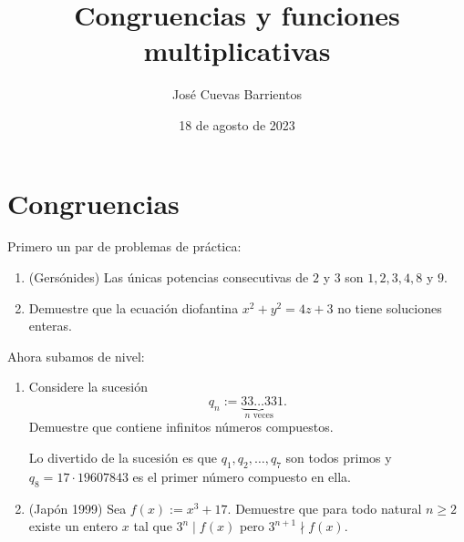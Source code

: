 \documentclass[11pt, reqno]{amsart}
\title{Congruencias y funciones multiplicativas}
\date{18 de agosto de 2023}
\author[José Cuevas]{José Cuevas Barrientos}
\begin{document}
\maketitle

\section{Congruencias}

\noindent
Primero un par de problemas de práctica:
\begin{enumerate}
	\item (Gersónides) Las únicas potencias consecutivas de $2$ y $3$ son $1, 2, 3, 4, 8$ y $9$.

	\item Demuestre que la ecuación diofantina $x^2 + y^2 = 4z + 3$ no tiene soluciones enteras.

\end{enumerate}
Ahora subamos de nivel:
\begin{enumerate}[resume]
	\item Considere la sucesión
		\[
			q_n := \underbrace{33\dots 33}_{n\text{ veces}} 1.
		\]
		Demuestre que contiene infinitos números compuestos.

		Lo divertido de la sucesión es que $q_1, q_2, \dots, q_7$ son todos primos y $q_8 = 17 \cdot 19607843$ es el primer número compuesto en ella.

	\item
		\hard
		(Japón 1999) Sea $f(x) := x^3 + 17$.
		Demuestre que para todo natural $n \ge 2$ existe un entero $x$ tal que $3^n \mid f(x)$ pero $3^{n+1} \nmid f(x)$.
\end{enumerate}
\end{document}
